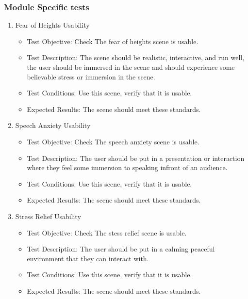 \documentclass[a4paper,10pt]{article}
\begin{document}
\subsubsection{Module Specific tests}
\begin{enumerate}
    \item  Fear of Heights Usability
     \begin{itemize}
	\item Test Objective: Check The fear of heights scene is usable.
	\item Test Description: The scene should be realistic, interactive, and run well, the user should be immersed in 
	the scene and should experience some believable stress or immersion in the scene.
	\item Test Conditions: Use this scene, verify that it is usable.
	\item Expected Results: The scene should meet these standards.
    \end{itemize}
    \item  Speech Anxiety Usability
     \begin{itemize}
	\item Test Objective: Check The speech anxiety  scene is usable.
	\item Test Description: The user should be put in a presentation or interaction where they feel some immersion to speaking infront of an audience.
	\item Test Conditions: Use this scene, verify that it is usable.
	\item Expected Results: The scene should meet these standards.
    \end{itemize}
    \item  Stress Relief Usability
     \begin{itemize}
	\item Test Objective: Check The stess relief scene is usable.
	\item Test Description: The user should be put in a calming peaceful environment that they can interact with.
	\item Test Conditions: Use this scene, verify that it is usable.
	\item Expected Results: The scene should meet these standards.
    \end{itemize}
    

\end{enumerate}
\pagebreak

\end{document}
